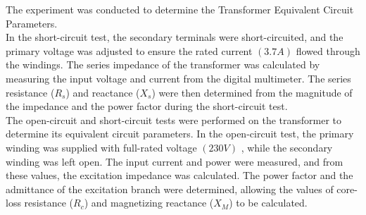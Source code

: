 \documentclass[a4paper,12pt]{article}
\begin{document}
	The experiment was conducted to determine the Transformer Equivalent Circuit Parameters.\\
	In the short-circuit test, the secondary terminals were short-circuited, and the primary voltage was adjusted to ensure the rated current $(3.7A)$ flowed through the windings. The series impedance of the transformer was calculated by measuring the input voltage and current from the digital multimeter. The series resistance ($R_s$) and reactance ($X_s$) were then determined from the magnitude of the impedance and the power factor during the short-circuit test.\\
	The open-circuit and short-circuit tests were performed on the transformer to determine its equivalent circuit parameters. In the open-circuit test, the primary winding was supplied with full-rated voltage $(230V)$ , while the secondary winding was left open. The input current and power were measured, and from these values, the excitation impedance was calculated. The power factor and the admittance of the excitation branch were determined, allowing the values of core-loss resistance ($R_c$) and magnetizing reactance ($X_M$) to be calculated.
	
	
\end{document}
